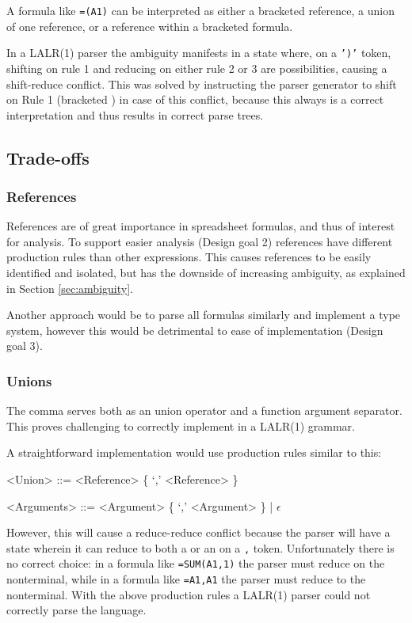 \documentclass[times]{smrauth}
\begin{document}
A formula like \texttt{=(A1)} can be interpreted as either a bracketed reference, a union of one reference, or a reference within a bracketed formula.

In a LALR(1) parser the ambiguity manifests in a state where, on a \texttt{')'} token, shifting on rule 1 and reducing on either rule 2 or 3 are possibilities, causing a shift-reduce conflict.
This was solved by instructing the parser generator to shift on Rule 1 (bracketed ) in case of this conflict, because this always is a correct interpretation and thus results in correct parse trees.

\subsection{Trade-offs}

\subsubsection{\textbf{References}}
\label{tradeoff:references}

References are of great importance in spreadsheet formulas, and thus of interest for analysis.
To support easier analysis (Design goal 2) references have different production rules than other expressions.
This causes references to be easily identified and isolated, but has the downside of increasing ambiguity, as explained in Section \ref{sec:ambiguity}. 

Another approach would be to parse all formulas similarly and implement a type system, however this would be detrimental to ease of implementation (Design goal 3).

\subsubsection{\textbf{Unions}}
\label{subsec:desing:unions}

The comma serves both as an union operator and a function argument separator.
This proves challenging to correctly implement in a LALR(1) grammar.

A straightforward implementation would use production rules similar to this:
\begin{grammar}
	<Union> ::= <Reference> \{ `,' <Reference> \}

	<Arguments> ::= <Argument> \{ `,' <Argument> \} | $\epsilon$
\end{grammar}

However, this will cause a reduce-reduce conflict because the parser will have a state wherein it can reduce to both a  or an  on a \texttt{,} token.
Unfortunately there is no correct choice: in a formula like \texttt{=SUM(A1,1)} the parser must reduce on the  nonterminal, while in a formula like \texttt{=A1,A1} the parser must reduce to the  nonterminal.
With the above production rules a LALR(1) parser could not correctly parse the language.
\end{document}
